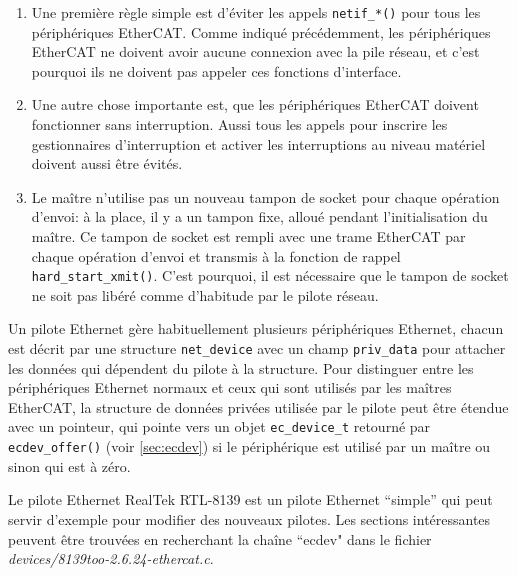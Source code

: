 \documentclass[a4paper,12pt,BCOR=6mm,bibtotoc,idxtotoc]{scrbook}
\begin{document}
\begin{enumerate}

\item Une premi\`ere r\`egle simple est d'\'eviter les appels
  \lstinline+netif_*()+ pour tous les p\'eriph\'eriques EtherCAT.
  Comme indiqu\'e pr\'ec\'edemment, les p\'eriph\'eriques EtherCAT ne
  doivent avoir aucune connexion avec la pile r\'eseau, et c'est
  pourquoi ils ne doivent pas appeler ces fonctions d'interface.

\item Une autre chose importante est, que les p\'eriph\'eriques
  EtherCAT doivent fonctionner sans interruption.  Aussi tous les
  appels pour inscrire les gestionnaires d'interruption et activer les
  interruptions au niveau mat\'eriel doivent aussi \^etre \'evit\'es.

\item Le ma\^itre n'utilise pas un nouveau tampon de socket pour
  chaque op\'eration d'envoi: \`a la place, il y a un tampon fixe,
  allou\'e pendant l'initialisation du ma\^itre. Ce tampon de socket
  est rempli avec une trame EtherCAT par chaque op\'eration d'envoi et
  transmis \`a la fonction de rappel
  \lstinline+hard_start_xmit()+. C'est pourquoi, il est n\'ecessaire
  que le tampon de socket ne soit pas lib\'er\'e comme d'habitude par
  le pilote r\'eseau.

\end{enumerate}

Un pilote Ethernet g\`ere habituellement plusieurs p\'eriph\'eriques
Ethernet, chacun est d\'ecrit par une structure \lstinline+net_device+
avec un champ \lstinline+priv_data+ pour attacher les donn\'ees qui
d\'ependent du pilote \`a la structure. Pour distinguer entre les
p\'eriph\'eriques Ethernet normaux et ceux qui sont utilis\'es par les
ma\^itres EtherCAT, la structure de donn\'ees priv\'ees utilis\'ee par
le pilote peut \^etre \'etendue avec un pointeur, qui pointe vers un
objet \lstinline+ec_device_t+ retourn\'e par
\lstinline+ecdev_offer()+ (voir \autoref{sec:ecdev}) si le
p\'eriph\'erique est utilis\'e par un ma\^itre ou sinon qui est \`a
z\'ero.

Le pilote Ethernet RealTek RTL-8139 est un pilote Ethernet ``simple''
qui peut servir d'exemple pour modifier des nouveaux pilotes.  Les
sections int\'eressantes peuvent \^etre trouv\'ees en recherchant la
cha\^ine ``ecdev" dans le fichier
\textit{devices/8139too-2.6.24-ethercat.c}.

\end{document}
